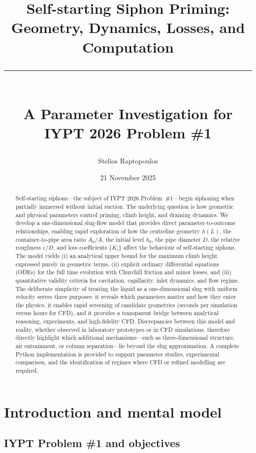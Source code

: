 \documentclass[11pt]{article}
\title{Self-starting Siphon Priming: Geometry, Dynamics, Losses, and Computation \\
       \rule{0.8\textwidth}{0.4pt} \\[0.2em]
       \large A Parameter Investigation for IYPT 2026 Problem \#1}
\author{Stelios Raptopoulos}
\date{21 November 2025}
\begin{document}
\maketitle

\begin{abstract}
Self-starting siphons---the subject of IYPT 2026 Problem~\#1---begin siphoning when partially immersed without initial suction. The underlying question is how geometric and physical parameters control priming, climb height, and draining dynamics.
We develop a one-dimensional slug-flow model that provides direct parameter-to-outcome relationships, enabling rapid exploration of how the centreline geometry $h(L)$, the container-to-pipe area ratio $A_0/A$, the initial level $h_0$, the pipe diameter $D$, the relative roughness $\varepsilon/D$, and loss coefficients $\{K_i\}$ affect the behaviour of self-starting siphons. The model yields (i) an analytical upper bound for the maximum climb height expressed purely in geometric terms, (ii) explicit ordinary differential equations (ODEs) for the full time evolution with Churchill friction and minor losses, and (iii) quantitative validity criteria for cavitation, capillarity, inlet dynamics, and flow regime.
The deliberate simplicity of treating the liquid as a one-dimensional slug with uniform velocity serves three purposes: it reveals which parameters matter and how they enter the physics, it enables rapid screening of candidate geometries (seconds per simulation versus hours for CFD), and it provides a transparent bridge between analytical reasoning, experiments, and high-fidelity CFD. Discrepancies between this model and reality, whether observed in laboratory prototypes or in CFD simulations, therefore directly highlight which additional mechanisms---such as three-dimensional structure, air entrainment, or column separation---lie beyond the slug approximation.
A complete Python implementation is provided to support parameter studies, experimental comparison, and the identification of regimes where CFD or refined modelling are required.
\end{abstract}

\tableofcontents

\bigskip

\section{Introduction and mental model}
\label{sec:intro}

\subsection{IYPT Problem \#1 and objectives}
\end{document}
